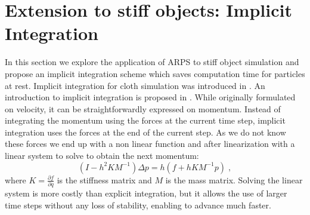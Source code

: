 \documentclass[11pt, oneside, a4paper]{memoir}
\begin{document}
\section{Extension to stiff objects: Implicit Integration} \label{sec cloth}
In this section we explore the application of ARPS to stiff object simulation and propose an implicit integration scheme which saves computation time for particles at rest.
Implicit integration for cloth simulation was introduced in \cite{Baraff1998}. An introduction to implicit integration is proposed in \cite{Witkin2001}.
While originally formulated on velocity, it can be straightforwardly expressed on momentum.
Instead of integrating the momentum using the forces at the current time step, implicit integration uses the forces at the end of the current step.
As we do not know these forces we end up with a non linear function and after linearization with a linear system to solve to obtain the next momentum:
\begin{equation}
    \label{eq:implicit}
    ( I -h^{2}KM^{-1} ) \Delta p = h( f + h KM^{-1}p ) \;,
\end{equation}
where $\displaystyle K = \frac{\partial f}{ \partial q}$ is the stiffness matrix and
$M$ is the mass matrix.
Solving the linear system is more costly than explicit integration, but it allows the use of larger time steps without any loss of stability, enabling to advance much faster.
\end{document}
